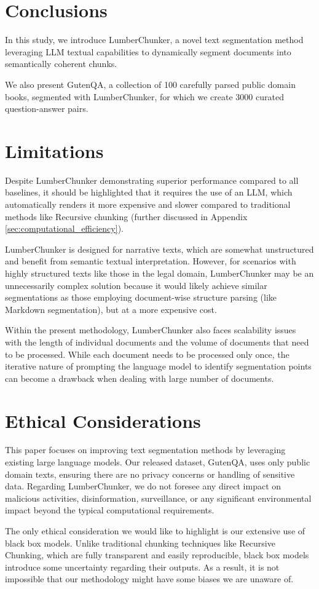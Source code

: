 \section{Conclusions}

In this study, we introduce LumberChunker, a novel text segmentation method leveraging LLM textual capabilities to dynamically segment documents into semantically coherent chunks.
\par
We also present GutenQA, a collection of 100 carefully parsed public domain books, segmented with LumberChunker, for which we create 3000 curated question-answer pairs.

\section{Limitations}
Despite LumberChunker demonstrating superior performance compared to all baselines, it should be highlighted that it requires the use of an LLM, which automatically renders it more expensive and slower compared to traditional methods like Recursive chunking (further discussed in Appendix \ref{sec:computational_efficiency}).
\par
LumberChunker is designed for narrative texts, which are somewhat unstructured and benefit from semantic textual interpretation. However, for scenarios with highly structured texts like those in the legal domain, LumberChunker may be an unnecessarily complex solution because it would likely achieve similar segmentations as those employing document-wise structure parsing (like Markdown segmentation), but at a more expensive cost.
\par
Within the present methodology, LumberChunker also faces scalability issues with the length of individual documents and the volume of documents that need to be processed. While each document needs to be processed only once, the iterative nature of prompting the language model to identify segmentation points can become a drawback when dealing with large number of documents.


\section{Ethical Considerations}

This paper focuses on improving text segmentation methods by leveraging existing large language models. Our released dataset, GutenQA, uses only public domain texts, ensuring there are no privacy concerns or handling of sensitive data. Regarding LumberChunker, we do not foresee any direct impact on malicious activities, disinformation, surveillance, or any significant environmental impact beyond the typical computational requirements.
\par
The only ethical consideration we would like to highlight is our extensive use of black box models. Unlike traditional chunking techniques like Recursive Chunking, which are fully transparent and easily reproducible, black box models introduce some uncertainty regarding their outputs. As a result, it is not impossible that our methodology might have some biases we are unaware of.